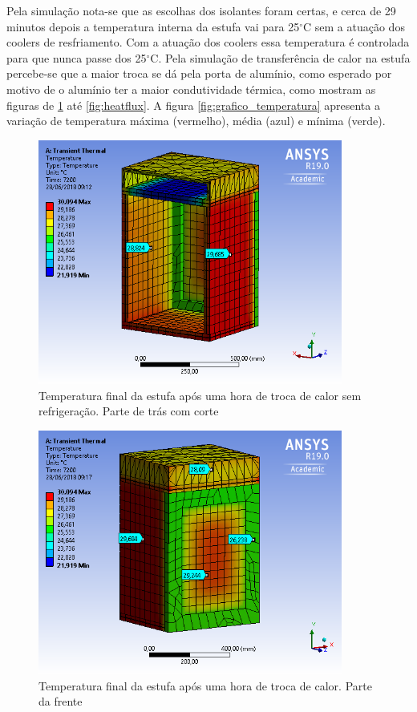 Pela simulação nota-se que as escolhas dos isolantes foram certas, e cerca de 29 minutos depois a temperatura interna da estufa vai para 25$^{\circ}$C sem a atuação dos coolers de resfriamento. Com a atuação dos coolers essa temperatura é controlada para que nunca passe dos 25$^{\circ}$C. Pela simulação de transferência de calor na estufa percebe-se que a maior troca se dá pela porta de alumínio, como esperado por motivo de o alumínio ter a maior condutividade térmica, como mostram as figuras de \ref{fig:temperatura1} até \ref{fig:heatflux}. A figura \ref{fig:grafico_temperatura} apresenta a variação de temperatura máxima (vermelho), média (azul) e mínima (verde).
\begin{figure}[H]
	\centering
	\includegraphics[width=10cm]{figuras/temperatura1.png}
	\caption{Temperatura final da estufa após uma hora de troca de calor sem refrigeração. Parte de trás com corte}
	\label{fig:temperatura1}
\end{figure}
\begin{figure}[H]
	\centering
	\includegraphics[width=10cm]{figuras/temperatura2.png}
	\caption{Temperatura final da estufa após uma hora de troca de calor. Parte da frente}
	\label{fig:temperatura2}
\end{figure}

